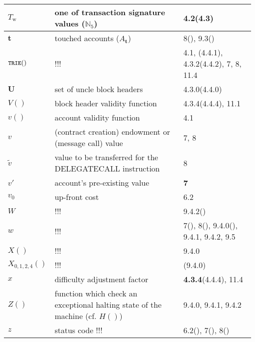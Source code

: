 \documentclass[9pt,oneside]{amsart}
\newcommand{\reff}[1]{{\footnotesize #1}}
\begin{document}
\begin{longtabu}{X[1.2lm] X[3] X}
$T_{\mathrm{w}}$ &
one of transaction signature values ($\mathbb{N}_{5}$) &
\reff{4.2(4.3)} \\\hline

$\mathbf{t}$ &
touched accounts ($A_{\mathbf{t}}$) &
\reff{8(), 9.3()} \\\hline

$\texttt{\small TRIE}()$ &
!!! &
\reff{4.1, (4.4.1), 4.3.2(4.4.2), 7, 8, 11.4} \\\hline

$\mathbf{U}$ &
set of uncle block headers &
\reff{4.3.0(4.4.0)} \\\hline

$V()$ &
block header validity function &
\reff{4.3.4(4.4.4), 11.1} \\\hline

$v()$ &
account validity function &
\reff{4.1} \\\hline

$v$ &
(contract creation) endowment or (message call) value &
\reff{7, 8} \\\hline

$\tilde{v}$ &
value to be transferred for the {\small DELEGATECALL} instruction &
\reff{8} \\\hline

$v'$ &
account's pre-existing value &
\reff{\textbf{7}} \\\hline

$v_0$ &
up-front cost &
\reff{6.2} \\\hline

$W$ &
!!! &
\reff{9.4.2()} \\\hline

$w$ &
!!! &
\reff{7(), 8(), 9.4.0(), 9.4.1, 9.4.2, 9.5} \\\hline

$X()$ &
!!! &
\reff{9.4.0} \\\hline

$X_{\mathrm{0,1,2,4}}()$ &
!!! &
\reff{(9.4.0)} \\\hline

$x$ &
difficulty adjustment factor &
\reff{\textbf{4.3.4}(4.4.4), 11.4} \\\hline

$Z()$ &
function which check an exceptional halting state of the machine (cf. $H()$) &
\reff{9.4.0, 9.4.1, 9.4.2} \\\hline

$z$ &
status code !!! &
\reff{6.2(), 7(), 8()} \\\hline

\end{longtabu}

\end{document}
